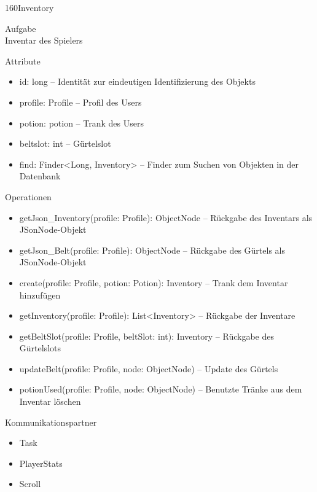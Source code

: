 \newpage
\begin{class}{160}{Inventory}
\item[Aufgabe]~\\
Inventar des Spielers
\item[Attribute]~\\
\begin{itemize}
\item id: long -- Identität zur eindeutigen Identifizierung des Objekts
\item profile: Profile -- Profil des Users
\item potion: potion -- Trank des Users
\item beltslot: int -- Gürtelslot
\item find: Finder<Long, Inventory> -- Finder zum Suchen von Objekten in der Datenbank
\end{itemize}
\item[Operationen]~\\
\begin{itemize}
\item getJson\_Inventory(profile: Profile): ObjectNode -- Rückgabe des Inventars als JSonNode-Objekt
\item getJson\_Belt(profile: Profile): ObjectNode -- Rückgabe des Gürtels als JSonNode-Objekt
\item create(profile: Profile, potion: Potion): Inventory -- Trank dem Inventar hinzufügen
\item getInventory(profile: Profile): List<Inventory> -- Rückgabe der Inventare
\item getBeltSlot(profile: Profile, beltSlot: int): Inventory -- Rückgabe des Gürtelslots
\item updateBelt(profile: Profile, node: ObjectNode) -- Update des Gürtels
\item potionUsed(profile: Profile, node: ObjectNode) -- Benutzte Tränke aus dem Inventar löschen
\end{itemize}
\item[Kommunikationspartner]~\\
\begin{itemize}
\item Task
\item PlayerStats
\item Scroll
\end{itemize}
\end{class}

